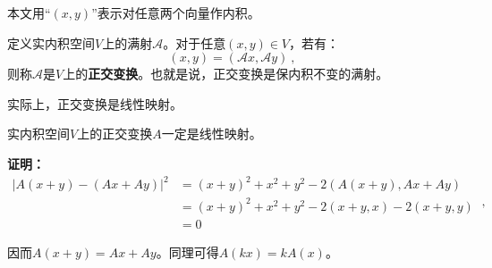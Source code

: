 
本文用“$(x,y)$”表示对任意两个向量作内积。
\begin{definition}{}
定义实内积空间$V$上的满射$\mathcal A$。对于任意$(x,y)\in V$，若有：
\begin{equation}
(x,y)=(\mathcal A x,\mathcal A y)~,
\end{equation}
则称$\mathcal A$是$V$上的\textbf{正交变换}。也就是说，正交变换是保内积不变的满射。
\end{definition}
实际上，正交变换是线性映射。
\begin{theorem}{}
实内积空间$V$上的正交变换$A$一定是线性映射。
\end{theorem}
\textbf{证明：}
\begin{equation}
\begin{aligned}
|A(x+y)-(Ax+Ay)|^2&=(x+y)^2+x^2+y^2-2\left(A(x+y),Ax+Ay\right)\\
&=(x+y)^2+x^2+y^2-2(x+y,x)-2(x+y,y)\\
&=0
\end{aligned}
~,\end{equation}

因而$A(x+y)=Ax+Ay$。同理可得$A(kx)=kA(x)$。


